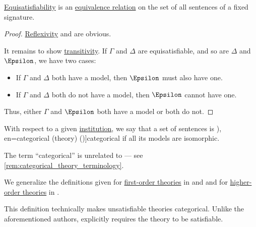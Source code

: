 \begin{proposition}\label{thm:equisatisfiability_is_equivalence_relation}
  \hyperref[def:equisatisfiability]{Equisatisfiability} is an \hyperref[def:equivalence_relation]{equivalence relation} on the set of all sentences of a fixed signature.
\end{proposition}
\begin{proof}
  \hyperref[def:binary_relation/reflexive]{Reflexivity} and  are obvious.

  It remains to show \hyperref[def:binary_relation/transitive]{transitivity}. If \( \Gamma \) and \( \Delta \) are equisatisfiable, and so are \( \Delta \) and \( \Epsilon \), we have two cases:
  \begin{itemize}
    \item If \( \Gamma \) and \( \Delta \) both have a model, then \( \Epsilon \) must also have one.
    \item If \( \Gamma \) and \( \Delta \) both do not have a model, then \( \Epsilon \) cannot have one.
  \end{itemize}

  Thus, either \( \Gamma \) and \( \Epsilon \) both have a model or both do not.
\end{proof}

\begin{definition}\label{def:categorical_logical_theory}
  With respect to a given \hyperref[def:institution]{institution}, we say that a set of sentences is \term[ru=категоричная (система аксиом) (\cite[248]{Мальцев1970АлгебраическиеСистемы}), en=categorical (theory) (\cite[def. 2.5.2]{Hinman2005Logic})]{categorical} if all its models are isomorphic.
\end{definition}
\begin{comments}
  \item The term \enquote{categorical} is unrelated to  --- see \cref{rem:categorical_theory_terminology}.

  \item We generalize the definitions given for \hyperref[def:fol_theory]{first-order theories} in \cite[def. 2.5.2]{Hinman2005Logic} and \cite[88]{Shoenfield1967MathematicalLogic} and for \hyperref[def:hol_theory]{higher-order theories} in \cite[exerc. X5502]{Andrews2002Logic}.

  This definition technically makes unsatisfiable theories categorical. Unlike the aforementioned authors, \textcite[def. 3.3.15]{VanDalen2004LogicAndStructure} explicitly requires the theory to be satisfiable.
\end{comments}

